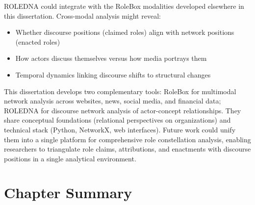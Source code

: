 \documentclass[../main.tex]{subfiles}
\begin{document}
ROLEDNA could integrate with the RoleBox modalities developed elsewhere in this dissertation. Cross-modal analysis might reveal:

\begin{itemize}
\item Whether discourse positions (claimed roles) align with network positions (enacted roles)
\item How actors discuss themselves versus how media portrays them
\item Temporal dynamics linking discourse shifts to structural changes
\end{itemize}

\begin{insightbox}
This dissertation develops two complementary tools: RoleBox for multimodal network analysis across websites, news, social media, and financial data; ROLEDNA for discourse network analysis of actor-concept relationships. They share conceptual foundations (relational perspectives on organizations) and technical stack (Python, NetworkX, web interfaces). Future work could unify them into a single platform for comprehensive role constellation analysis, enabling researchers to triangulate role claims, attributions, and enactments with discourse positions in a single analytical environment.
\end{insightbox}


\section{Chapter Summary}
\end{document}
